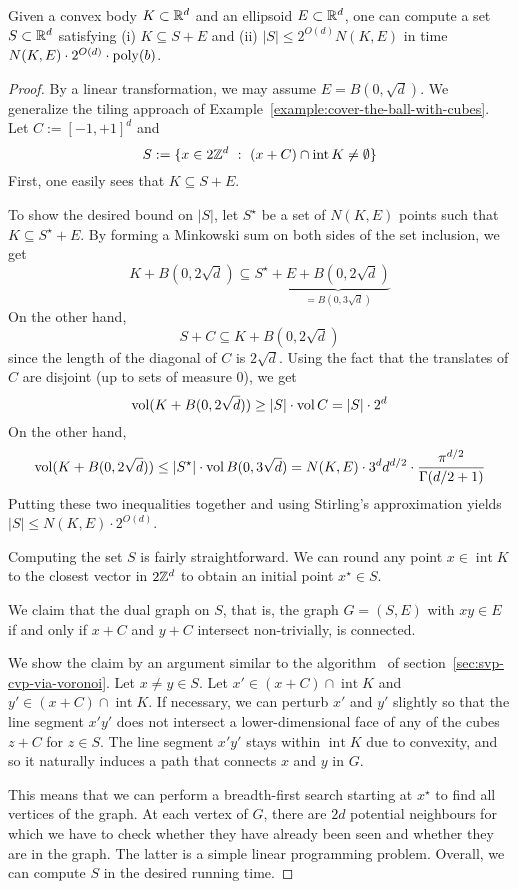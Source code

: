 \begin{lemma}
  Given a convex body $K \subset \mathbb{R}^d$ and an ellipsoid $E \subset \mathbb{R}^d$,
  one can compute a set $S \subset \mathbb{R}^d$ satisfying
  (i) $K \subseteq S + E$ and (ii) $|S| \leq 2^{O(d)} N(K,E)$
  in time $N(K,E) \cdot 2^{O(d)} \cdot \operatorname{poly}(b)$.
\end{lemma}
\begin{proof}
  By a linear transformation,
  we may assume $E = B(0,\sqrt{d})$.
  We generalize the tiling approach of Example~\ref{example:cover-the-ball-with-cubes}.
  Let $C := [-1,+1]^d$ and
  \[
    S := \{ x \in 2\mathbb{Z}^d ~:~ (x + C) \cap \operatorname{int} K \neq \emptyset \}
  \]
  First, one easily sees that $K \subseteq S + E$.
  
  To show the desired bound on $|S|$,
  let $S^\star$ be a set of $N(K,E)$ points
  such that $K \subseteq S^\star + E$.
  By forming a Minkowski sum on both sides of the set inclusion, we get
  \[
    K + B(0,2\sqrt{d}) \subseteq S^\star + \underbrace{E + B(0,2\sqrt{d})}_{= B(0,3\sqrt{d})}
  \]
  On the other hand,
  \[
    S + C \subseteq K + B(0,2\sqrt{d})
  \]
  since the length of the diagonal of $C$ is $2\sqrt{d}$.
  Using the fact that the translates of $C$ are disjoint (up to sets of measure $0$),
  we get
  \[
    \operatorname{vol}(K + B(0,2\sqrt{d})) \geq |S| \cdot \operatorname{vol} C = |S| \cdot 2^d
  \]
  On the other hand,
  \[
    \operatorname{vol}(K + B(0,2\sqrt{d})) \leq |S^\star| \cdot \operatorname{vol} B(0,3\sqrt{d})
    = N(K,E) \cdot 3^d d^{d/2} \cdot \frac{\pi^{d/2}}{\Gamma(d/2 + 1)}
  \]
  Putting these two inequalities together and using Stirling's approximation
  yields $|S| \leq N(K,E) \cdot 2^{O(d)}$.
  
  Computing the set $S$ is fairly straightforward.
  We can round any point $x \in \operatorname{int} K$ to the closest vector in $2 \mathbb{Z}^d$
  to obtain an initial point $x^\star \in S$.

  We claim that the dual graph on $S$,
  that is,
  the graph $G = (S,E)$ with $xy \in E$ if and only if $x+C$ and $y+C$ intersect non-trivially,
  is connected.

  We show the claim by an argument similar to the algorithm~
  of section~\ref{sec:svp-cvp-via-voronoi}.
  Let $x \neq y \in S$.
  Let $x' \in (x+C) \cap \operatorname{int} K$ and $y' \in (x+C) \cap \operatorname{int} K$.
  If necessary, we can perturb $x'$ and $y'$ slightly
  so that the line segment $x'y'$
  does not intersect a lower-dimensional face of any of the cubes $z + C$ for $z \in S$.
  The line segment $x'y'$ stays within $\operatorname{int} K$ due to convexity,
  and so it naturally induces a path that connects $x$ and $y$ in $G$.

  This means that we can perform a breadth-first search starting at $x^\star$ to find all vertices of the graph.
  At each vertex of $G$, there are $2d$ potential neighbours for which we have to check
  whether they have already been seen and whether they are in the graph.
  The latter is a simple linear programming problem.
  Overall, we can compute $S$ in the desired running time.
\end{proof}

